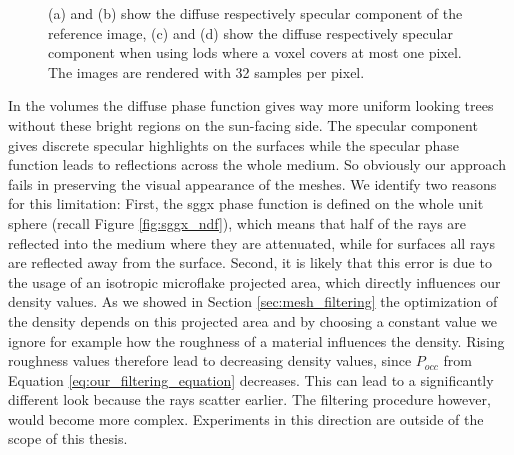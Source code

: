 \begin{figure}[ht]
\begin{subfigure}[b]{0.49\linewidth}
        \caption{}
    \end{subfigure}
    \caption[Diffuse and specular components rendered seperately]{(a) and (b) show the diffuse respectively specular component of the reference image, (c) and (d) show the diffuse respectively specular component when using \acsp{lod} where a voxel covers at most one pixel. The images are rendered with 32 samples per pixel.}
	\label{fig:diffuse_specular_breakdown}
\end{figure}
In the volumes the diffuse phase function gives way more uniform looking trees without these bright regions on the sun-facing side.
The specular component gives discrete specular highlights on the surfaces while the specular phase function leads to reflections across the whole medium.
So obviously our approach fails in preserving the visual appearance of the meshes.
We identify two reasons for this limitation: First, the \ac{sggx} phase function is defined on the whole unit sphere (recall Figure \ref{fig:sggx_ndf}), which means that half of the rays are reflected into the medium where they are attenuated, while for surfaces all rays are reflected away from the surface.
Second, it is likely that this error is due to the usage of an isotropic microflake projected area, which directly influences our density values.
As we showed in Section \ref{sec:mesh_filtering} the optimization of the density depends on this projected area and by choosing a constant value we ignore for example how the roughness of a material influences the density.
Rising roughness values therefore lead to decreasing density values, since $P_{occ}$ from Equation \ref{eq:our_filtering_equation} decreases.
This can lead to a significantly different look because the rays scatter earlier.
The filtering procedure however, would become more complex.
Experiments in this direction are outside of the scope of this thesis.


